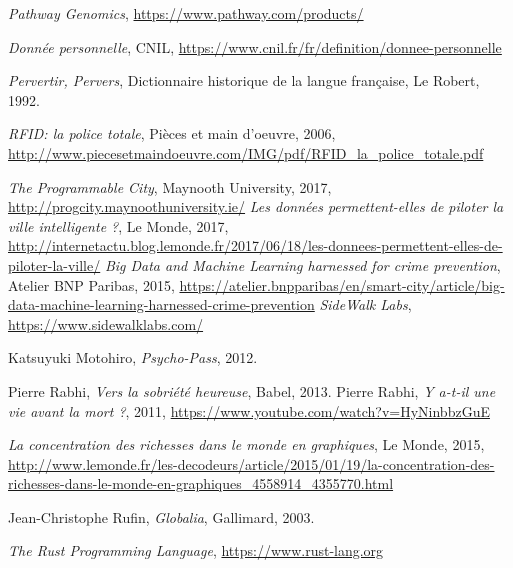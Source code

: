 \begin{thebibliography}{99}
     \emph{Pathway Genomics}, \url{https://www.pathway.com/products/}

     \emph{Donnée personnelle}, CNIL, \url{https://www.cnil.fr/fr/definition/donnee-personnelle}

     \emph{Pervertir, Pervers}, Dictionnaire historique de la langue française, Le Robert, 1992.

     \emph{RFID: la police totale}, Pièces et main d'oeuvre, 2006, \url{http://www.piecesetmaindoeuvre.com/IMG/pdf/RFID_la_police_totale.pdf}

     \emph{The Programmable City}, Maynooth University, 2017, \url{http://progcity.maynoothuniversity.ie/}
     \emph{Les données permettent-elles de piloter la ville intelligente ?}, Le Monde, 2017, \url{http://internetactu.blog.lemonde.fr/2017/06/18/les-donnees-permettent-elles-de-piloter-la-ville/}
     \emph{Big Data and Machine Learning harnessed for crime prevention}, Atelier BNP Paribas, 2015, \url{https://atelier.bnpparibas/en/smart-city/article/big-data-machine-learning-harnessed-crime-prevention}
     \emph{SideWalk Labs}, \url{https://www.sidewalklabs.com/}

     Katsuyuki Motohiro, \emph{Psycho-Pass}, 2012.

     Pierre Rabhi, \emph{Vers la sobriété heureuse}, Babel, 2013.
     Pierre Rabhi, \emph{Y a-t-il une vie avant la mort ?}, 2011, \url{https://www.youtube.com/watch?v=HyNinbbzGuE}

     \emph{La concentration des richesses dans le monde en graphiques}, Le Monde, 2015, \url{http://www.lemonde.fr/les-decodeurs/article/2015/01/19/la-concentration-des-richesses-dans-le-monde-en-graphiques_4558914_4355770.html}

     Jean-Christophe Rufin, \emph{Globalia}, Gallimard, 2003.

     \emph{The Rust Programming Language}, \url{https://www.rust-lang.org}


\end{thebibliography}
